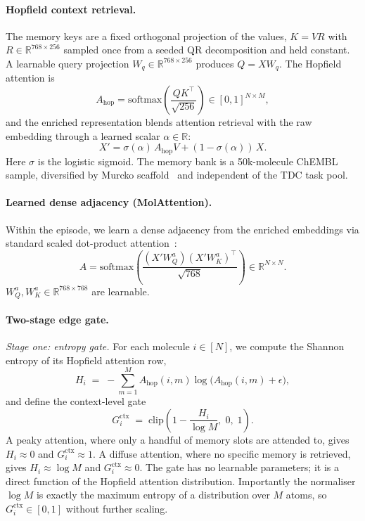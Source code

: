 \documentclass{article}
\theoremstyle{plain}
\theoremstyle{definition}
\theoremstyle{remark}
\begin{document}
\paragraph{Hopfield context retrieval.}
The memory keys are a fixed orthogonal projection of the values, $K = V R$ with $R\in\mathbb{R}^{768\times 256}$ sampled once from a seeded QR decomposition and held constant. A learnable query projection $W_q\in\mathbb{R}^{768\times 256}$ produces $Q = X W_q$. The Hopfield attention is
\begin{equation}
    A_{\text{hop}} = \mathrm{softmax}\!\left(\frac{Q K^\top}{\sqrt{256}}\right) \in [0,1]^{N\times M},
\end{equation}
and the enriched representation blends attention retrieval with the raw embedding through a learned scalar $\alpha\in\mathbb{R}$:
\begin{equation}
    X' = \sigma(\alpha) \, A_{\text{hop}} V + (1-\sigma(\alpha))\, X.
\end{equation}
Here $\sigma$ is the logistic sigmoid. The memory bank is a 50k-molecule ChEMBL~\citep{mendez2019chembl} sample, diversified by Murcko scaffold~\citep{lipkus1999murcko} and independent of the TDC task pool.

\paragraph{Learned dense adjacency (MolAttention).}
Within the episode, we learn a dense adjacency from the enriched embeddings via standard scaled dot-product attention~\citep{vaswani2017attention}:
\begin{equation}
    A = \mathrm{softmax}\!\left(\frac{(X' W_Q^a)(X' W_K^a)^\top}{\sqrt{768}}\right) \in \mathbb{R}^{N\times N}.
\end{equation}
$W_Q^a, W_K^a \in \mathbb{R}^{768\times 768}$ are learnable.

\paragraph{Two-stage edge gate.}

\emph{Stage one: entropy gate.} For each molecule $i\in[N]$, we compute the Shannon entropy of its Hopfield attention row,
\begin{equation}
    H_i \;=\; -\sum_{m=1}^{M} A_{\text{hop}}(i,m)\log\bigl(A_{\text{hop}}(i,m)+\epsilon\bigr),
\end{equation}
and define the context-level gate
\begin{equation}
    G^{\text{ctx}}_i \;=\; \mathrm{clip}\!\left(1 - \frac{H_i}{\log M},\; 0,\; 1\right).
\end{equation}
A peaky attention, where only a handful of memory slots are attended to, gives $H_i\approx 0$ and $G^{\text{ctx}}_i\approx 1$. A diffuse attention, where no specific memory is retrieved, gives $H_i\approx\log M$ and $G^{\text{ctx}}_i\approx 0$. The gate has no learnable parameters; it is a direct function of the Hopfield attention distribution. Importantly the normaliser $\log M$ is exactly the maximum entropy of a distribution over $M$ atoms, so $G^{\text{ctx}}_i\in[0,1]$ without further scaling.
\end{document}
